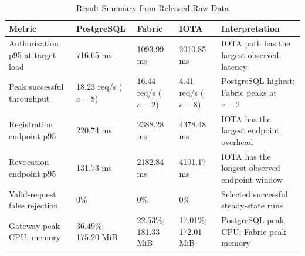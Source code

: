 \begin{table}[t]
\caption{Result Summary from Released Raw Data}
\label{tab:summary}
\centering
\footnotesize
\begin{tabularx}{\textwidth}{@{}X l l l X@{}}
\toprule
Metric & PostgreSQL & Fabric & IOTA & Interpretation \\
\midrule
Authorization p95 at target load & 716.65 ms & 1093.99 ms & 2010.85 ms & IOTA path has the largest observed latency \\
Peak successful throughput & 18.23 req/s ($c=8$) & 16.44 req/s ($c=2$) & 4.41 req/s ($c=8$) & PostgreSQL highest; Fabric peaks at $c=2$ \\
Registration endpoint p95 & 220.74 ms & 2388.28 ms & 4378.48 ms & IOTA has the largest endpoint overhead \\
Revocation endpoint p95 & 131.73 ms & 2182.84 ms & 4101.17 ms & IOTA has the longest observed endpoint window \\
Valid-request false rejection & 0\% & 0\% & 0\% & Selected successful steady-state runs \\
Gateway peak CPU; memory & 36.49\%; 175.20 MiB & 22.53\%; 181.33 MiB & 17.01\%; 172.01 MiB & PostgreSQL peak CPU; Fabric peak memory \\
\bottomrule
\end{tabularx}
\end{table}
